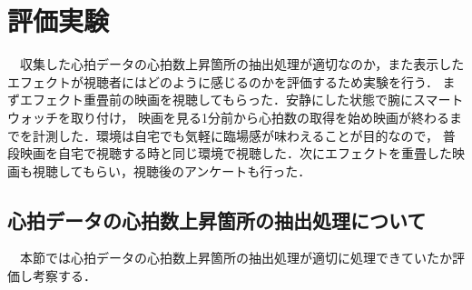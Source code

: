 \thispagestyle{myheadings}
\chapter{評価実験}

　収集した心拍データの心拍数上昇箇所の抽出処理が適切なのか，また表示したエフェクトが視聴者にはどのように感じるのかを評価するため実験を行う．
まずエフェクト重畳前の映画を視聴してもらった．安静にした状態で腕にスマートウォッチを取り付け，
映画を見る1分前から心拍数の取得を始め映画が終わるまでを計測した．環境は自宅でも気軽に臨場感が味わえることが目的なので，
普段映画を自宅で視聴する時と同じ環境で視聴した．次にエフェクトを重畳した映画も視聴してもらい，視聴後のアンケートも行った．

\section{心拍データの心拍数上昇箇所の抽出処理について}
　本節では心拍データの心拍数上昇箇所の抽出処理が適切に処理できていたか評価し考察する．

